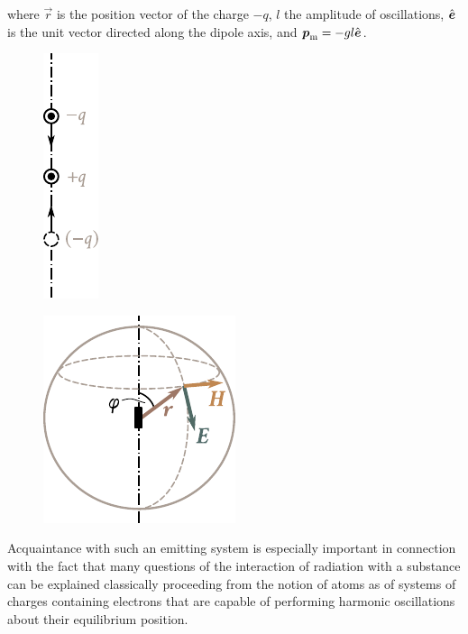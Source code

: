 \noindent
where $\vec{r}$ is the position vector of the charge $-q$, $l$ the amplitude of oscillations, $\hat{\boldsymbol{e}}$ is the unit vector directed along the dipole axis, and $\boldsymbol{p}_{\text{m}} =-gl\hat{\boldsymbol{e}}$.

\begin{figure}[t]
	\begin{minipage}[t]{0.48\linewidth}
		\begin{center}
			\includegraphics[scale=1]{figures/ch_15/fig_15_5.pdf}
			\caption[]{}
			\label{fig:15_5}
		\end{center}
	\end{minipage}
	\hfill{ }%
	\begin{minipage}[t]{0.48\linewidth}
		\begin{center}
			\includegraphics[scale=1]{figures/ch_15/fig_15_6.pdf}
			\caption[]{}
			\label{fig:15_6}
		\end{center}
	\end{minipage}
\vspace{-0.4cm}
\end{figure}

Acquaintance with such an emitting system is especially important in connection with the fact that many questions of the interaction of radiation with a substance can be explained classically proceeding from the notion of atoms as of systems of charges containing electrons that are capable of performing harmonic oscillations about their equilibrium position.

